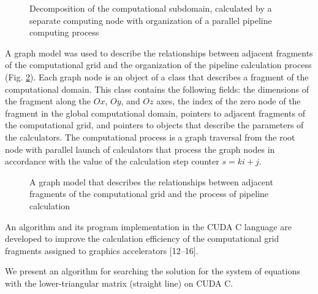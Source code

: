 \documentclass{svproc}
\begin{document}
\begin{figure}[h!]
	\caption{Decomposition of the computational subdomain, calculated by a separate computing node with organization of a parallel pipeline computing process} \label{fig2}
\end{figure}

A graph model was used to describe the relationships between adjacent fragments of the computational grid and the organization of the pipeline calculation process (Fig. \ref{fig3}). Each graph node is an object of a class that describes a fragment of the computational domain. This class contains the following fields: the dimensions of the fragment along the $Ox$, $Oy$, and $Oz$ axes, the index of the zero node of the fragment in the global computational domain, pointers to adjacent fragments of the computational grid, and pointers to objects that describe the parameters of the calculators. The computational process is a graph traversal from the root node with parallel launch of calculators that process the graph nodes in accordance with the value of the calculation step counter $s=ki+j$.

\begin{figure}[h!]
	\caption{A graph model that describes the relationships between adjacent fragments of the computational grid and the process of pipeline calculation} \label{fig3}
\end{figure}

An algorithm and its program implementation in the CUDA C language are developed to improve the calculation efficiency of the computational grid fragments assigned to graphics accelerators [12--16].

We present an algorithm for searching the solution for the system of equations with the lower-triangular matrix (straight line) on CUDA C. 
\end{document}
